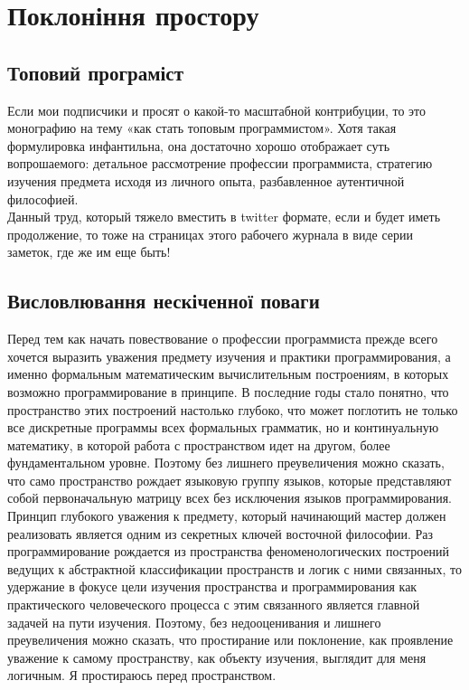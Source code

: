 \section{Поклоніння простору}

\subsection{Топовий програміст}

Если мои подписчики и просят о какой-то масштабной контрибуции,
то это монографию на тему «как стать топовым программистом».
Хотя такая формулировка инфантильна, она достаточно хорошо
отображает суть вопрошаемого: детальное рассмотрение профессии
программиста, стратегию изучения предмета исходя из личного
опыта, разбавленное аутентичной философией.
\\
Данный труд, который тяжело вместить в twitter формате, если
и будет иметь продолжение, то тоже на страницах этого рабочего
журнала в виде серии заметок, где же им еще быть!

\subsection{Висловлювання нескіченної поваги}

Перед тем как начать повествование о профессии программиста
прежде всего хочется выразить уважения предмету изучения и
практики программирования, а именно формальным математическим
вычислительным построениям, в которых возможно программирование
в принципе. В последние годы стало понятно, что пространство
этих построений настолько глубоко, что может поглотить не
только все дискретные программы всех формальных грамматик,
но и континуальную математику, в которой работа с пространством
идет на другом, более фундаментальном уровне. Поэтому без лишнего
 преувеличения можно сказать, что само пространство рождает
языковую группу языков, которые представляют собой первоначальную
матрицу всех без исключения языков программирования.
\\
Принцип глубокого уважения к предмету, который начинающий
мастер должен реализовать является одним из секретных ключей
восточной философии. Раз программирование рождается из
пространства феноменологических построений ведущих к абстрактной
классификации пространств и логик с ними связанных, то удержание
в фокусе цели изучения пространства и программирования как
практического человеческого процесса с этим связанного является
главной задачей на пути изучения. Поэтому, без недооценивания и
лишнего преувеличения можно сказать, что простирание или поклонение,
как проявление уважение к самому пространству, как объекту изучения,
выглядит для меня логичным. Я простираюсь перед пространством.

